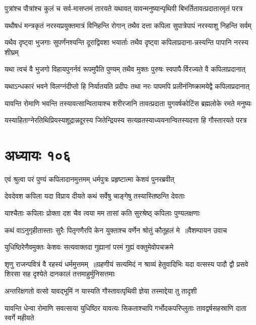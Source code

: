 \twolineshloka
{पुत्रांश्च पौत्रांश्च कुलं च सर्व-मासप्तमं तारयते यथावत्}
{यावन्मनुष्यान्पृथिवी बिभर्तितावत्प्रदातारमृतं परत्र}


\twolineshloka
{यथौषधं मन्त्रकृतं नरस्यप्रयुक्तमात्रं विनिहन्ति रोगान्}
{तथैव दत्ता कपिला सुपात्रेपापं नरस्याशु निहन्ति सर्वम्}


\twolineshloka
{यथैव दृष्ट्वा भुजगाः सुपर्णंनश्यन्ति दूराद्विवशा भयार्ताः}
{तथैव दृष्ट्वा कपिलाप्रदाना-न्नस्यन्ति पापानि नरस्य शीघ्रम्}


\twolineshloka
{यथा त्वचं वै भुजगो विहायपुनर्नवं रूपमुपैति पुण्यम्}
{तथैव मुक्तः पुरुषः स्वपापै-र्विरज्यते वै कपिलाप्रदानात्}


\twolineshloka
{यथाऽन्धकारं भवने विलग्नंदीप्तो हि निर्यातयति प्रदीपः}
{तथा नरः पापमपि प्रलीनंनिष्क्रामयेद्वै कपिलाप्रदानात्}


\twolineshloka
{यावन्ति रोमाणि भवन्ति तस्यावत्सान्वितायाश्च शरीरजानि}
{तावत्प्रदाता युगवर्षकोटिंस ब्रह्मलोके रमते मनुष्यः}


\twolineshloka
{यस्याहिताग्नेरतिथिप्रियस्यशूद्रान्नदूरस्य जितेन्द्रियस्य}
{सत्यव्रतस्याध्ययनान्वितस्यदत्ता हि गौस्तारयते परत्र}


\chapter{अध्यायः १०६}
\twolineshloka
{एवं श्रुत्वा परं पुण्यं कपिलादानमुत्तमम्}
{धर्मपुत्रः प्रहृष्टात्मा केशवं पुनरब्रवीत्}


\twolineshloka
{देवदेवश कपिला यदा विप्राय दीयते}
{कथं सर्वेषु चाङ्गेषु तस्यास्तिष्ठन्ति देवताः}


\twolineshloka
{याश्चैताः कपिलाः प्रोक्ता दश चैव त्वया मम}
{तासां कति सुरश्रेष्ठ् कपिलाः पुण्यलक्षणाः}


\threelineshloka
{कथं वाऽनुगृहीतास्ताः सुरैः पितृगणैरपि}
{केन युक्ताश्च वर्णेन श्रोतुं कौतूहलं मे ॥वैशम्पायन उवाच}
{}


\twolineshloka
{युधिष्ठिरेणैवमुक्तः केशवः सत्यवाक्तदा}
{गुह्यानां परमं गुह्यं वक्तुमेवोपचक्रमे}


शृणु राजन्पवित्रं वै रहस्यं धर्ममुत्तमम् ॥ग्रहणीयं सत्यमिदं न श्राव्यं हेतुवादिभिः
\twolineshloka
{यदा वत्सस्य पादौ द्वौ प्रसवे शिरसा सह}
{दृश्येते दानकालं तत्तमाहुर्मुनिसत्तमाः}


\twolineshloka
{अन्तरिक्षगतो वत्सो यावद्भूमिं न यास्यति}
{गौस्तावत्पृथिवी ज्ञेया तस्माद्देया तु तादृशी}


\threelineshloka
{यावन्ति धेन्वा रोमाणि सवत्साया युधिष्ठिर}
{यावत्यः सिकताश्चापि गर्भोदकपरिप्लुताः}
{तावद्वर्षसहस्राणि दाता स्वर्गे महीयते}


